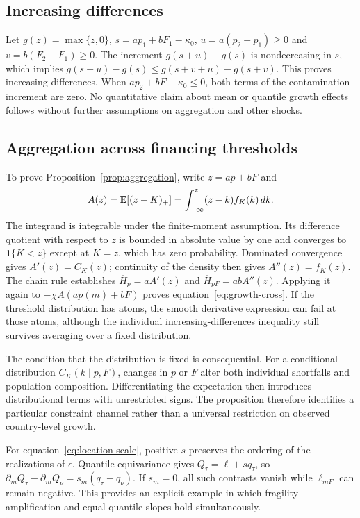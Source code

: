 \subsection{Increasing differences}
Let $g(z)=\max\{z,0\}$, $s=ap_1+bF_1-\kappa_0$,
$u=a(p_2-p_1)\ge0$ and $v=b(F_2-F_1)\ge0$.
The increment $g(s+u)-g(s)$ is nondecreasing in $s$, which implies
$g(s+u)-g(s)\le g(s+v+u)-g(s+v)$. This proves increasing differences.
When $ap_2+bF-\kappa_0\le0$, both terms of the contamination increment
are zero. No quantitative claim about mean or quantile growth effects follows
without further assumptions on aggregation and other shocks.

\subsection{Aggregation across financing thresholds}
To prove Proposition~\ref{prop:aggregation}, write $z=ap+bF$ and
\[
 A(z)=\mathbb{E}[(z-K)_+]=\int_{-\infty}^{z}(z-k)f_K(k)\,dk.
\]
The integrand is integrable under the finite-moment assumption. Its
difference quotient with respect to $z$ is bounded in absolute value by one
and converges to $\mathbf{1}\{K<z\}$ except at $K=z$, which has zero
probability. Dominated convergence gives $A'(z)=C_K(z)$; continuity of the
density then gives $A''(z)=f_K(z)$. The chain rule establishes
$\overline H_p=aA'(z)$ and $\overline H_{pF}=abA''(z)$. Applying it again
to $-\chi A(ap(m)+bF)$ proves equation~\eqref{eq:growth-cross}.
If the threshold distribution has atoms, the smooth derivative expression
can fail at those atoms, although the individual increasing-differences
inequality still survives averaging over a fixed distribution.

The condition that the distribution is fixed is consequential. For a
conditional distribution $C_K(k\mid p,F)$, changes in $p$ or $F$ alter
both individual shortfalls and population composition. Differentiating the
expectation then introduces distributional terms with unrestricted signs.
The proposition therefore identifies a particular constraint channel rather
than a universal restriction on observed country-level growth.

For equation~\eqref{eq:location-scale}, positive $s$ preserves the ordering
of the realizations of $\epsilon$. Quantile equivariance gives
$Q_\tau=\ell+s q_\tau$, so
$\partial_m Q_\tau-\partial_m Q_\nu=s_m(q_\tau-q_\nu)$.
If $s_m=0$, all such contrasts vanish while $\ell_{mF}$ can remain negative.
This provides an explicit example in which fragility amplification and equal
quantile slopes hold simultaneously.

